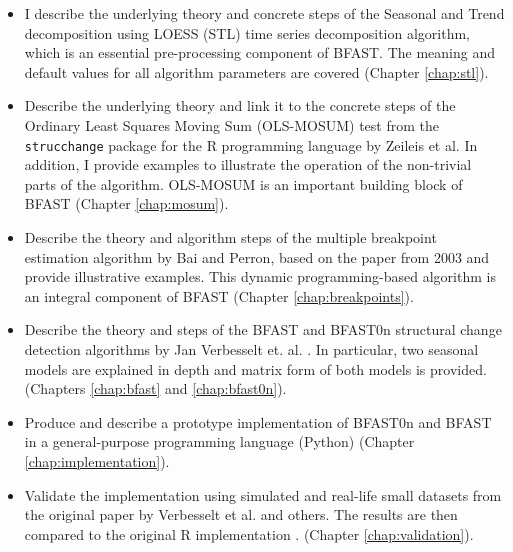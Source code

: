 \documentclass[main.tex]{subfiles}
\begin{document}
\begin{itemize}
\item I describe the underlying theory and concrete steps of the Seasonal and
  Trend decomposition using LOESS (STL) time series decomposition algorithm,
  which is an essential pre-processing component of BFAST. The meaning and
  default values for all algorithm parameters are covered (Chapter
  \ref{chap:stl}).
\item Describe the underlying theory and link it to the concrete steps of
  the Ordinary Least Squares Moving Sum (OLS-MOSUM) test from the
  \texttt{strucchange} package \cite{strucchange} for the R programming
  language by Zeileis et al. In addition, I provide examples to illustrate the
  operation of the non-trivial parts of the algorithm. OLS-MOSUM is an
  important building block of BFAST (Chapter \ref{chap:mosum}).
\item Describe the theory and algorithm steps of the multiple
  breakpoint estimation algorithm by Bai and Perron, based on the paper from 2003 \cite{bai_perron}
  and provide illustrative examples. This dynamic programming-based algorithm is
  an integral component of BFAST (Chapter \ref{chap:breakpoints}).
\item Describe the theory and steps of the BFAST and BFAST0n structural change
  detection algorithms by Jan Verbesselt et. al. \cite{bfast}. In particular,
  two seasonal models are explained in depth and matrix form of both models is
  provided. (Chapters \ref{chap:bfast} and \ref{chap:bfast0n}).
\item Produce and describe a prototype implementation of BFAST0n and BFAST in a
  general-purpose programming language (Python) (Chapter \ref{chap:implementation}).
\item Validate the implementation using simulated and real-life small
  datasets from the original paper by Verbesselt et al. \cite{bfast} and others.
  The results are then compared to the original R implementation \cite{bfast-github}.
  (Chapter \ref{chap:validation}). 
\end{itemize}

\biblio
\end{document}
